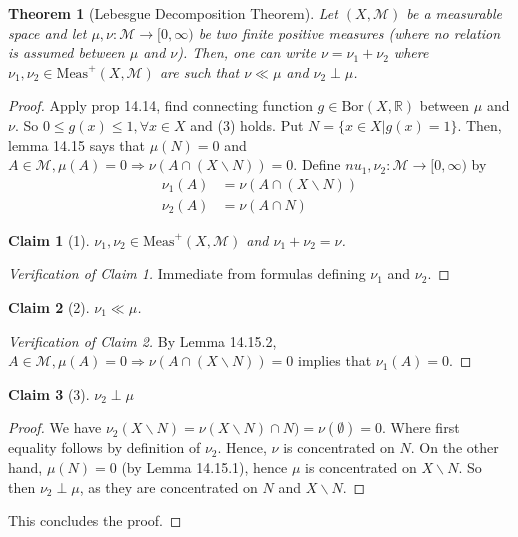 \documentclass[letterpaper, 12pt]{article}
\newcommand{\cM}{\mathcal{M}}
\newcommand{\bR}{\mathbb{R}}
\newcommand{\Meas}{\mathrm{Meas}}
\newcommand{\Bor}{\mathrm{Bor}}
\theoremstyle{stdthm}
\newtheorem{thm}{Theorem}[section]
\theoremstyle{stddef}
\theoremstyle{stdnonum}
\newtheorem{claim}{Claim}
\theoremstyle{stdqands}
\theoremstyle{stdbold}
\begin{document}
\begin{thm}[Lebesgue Decomposition Theorem]
Let $(X,\cM)$ be a measurable space and let $\mu, \nu: \cM \rightarrow [0,\infty)$ be two finite positive measures (where no relation is assumed between $\mu$ and $\nu$). Then, one can write $\nu = \nu_1 + \nu_2$ where $\nu_1,\nu_2 \in \Meas^+(X,\cM)$ are such that $\nu \ll \mu$ and $\nu_2 \perp \mu$.  
\end{thm}

\begin{proof}
Apply prop 14.14, find connecting function $g \in \Bor(X,\bR)$ between $\mu$ and $\nu$. So $0\leq g(x) \leq 1, \forall x \in X$ and (3) holds. Put $N = \{x \in X| g(x) = 1\}$. Then, lemma 14.15 says that $\mu(N) = 0$ and $A \in \cM, \mu(A) = 0 \Rightarrow \nu(A \cap (X \backslash N)) = 0$. Define $nu_1,\nu_2: \cM \to [0,\infty)$ by 
\begin{align*}
\nu_1(A) &= \nu(A \cap (X \backslash N))\\
\nu_2(A) &= \nu(A \cap N)
\end{align*}

\begin{claim} [1]
$\nu_1,\nu_2 \in \Meas^+(X,\cM)$ and $\nu_1 + \nu_2 = \nu$. 
\end{claim}

\begin{proof} [Verification of Claim 1]
Immediate from formulas defining $\nu_1$ and $\nu_2$.
\end{proof}

\begin{claim}[2]
$\nu_1 \ll \mu$.
\end{claim}

\begin{proof} [Verification of Claim 2]
By Lemma 14.15.2, $A \in \cM, \mu(A) = 0 \Rightarrow \nu(A \cap(X \backslash N)) = 0$ implies that $\nu_1(A) = 0$. 
\end{proof}

\begin{claim}[3]
$\nu_2 \perp \mu$
\end{claim}

\begin{proof}
We have $\nu_2(X \backslash N) = \nu(X \backslash N) \cap N) = \nu(\emptyset) = 0$. Where first equality follows by definition of $\nu_2$. Hence, $\nu$ is concentrated on $N$. On the other hand, $\mu(N) = 0$ (by Lemma 14.15.1), hence $\mu$ is concentrated on $X \backslash N$. So then $\nu_2 \perp \mu$, as they are concentrated on $N$ and $X \backslash N$. 
\end{proof}
This concludes the proof. 
 
\end{proof}
\end{document}
